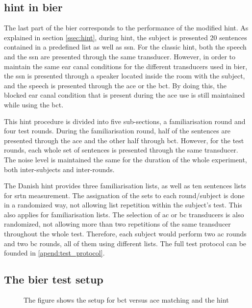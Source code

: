 \subsection{\gls{hint} in \gls{bier}}
The last part of the \gls{bier} corresponds to the performance of the modified \gls{hint}. As explained in section \autoref{ssec:hint}, during \gls{hint}, the subject is presented 20 sentences contained in a predefined list as well as \gls{ssn}. For the classic \gls{hint}, both the speech and the \gls{ssn} are presented through the same transducer. However, in order to maintain the same ear canal conditions for the different transducers used in \gls{bier}, the \gls{ssn} is presented through a speaker located inside the room with the subject, and the speech is presented through the  \gls{ace} or the \gls{bct}. By doing this, the blocked ear canal condition that is present during the \gls{ace} use is still maintained while using the \gls{bct}.

This \gls{hint} procedure is divided into five sub-sections, a familiarisation round and four test rounds. During the familiarisation round, half of the sentences are presented through the \gls{ace} and the other half through \gls{bct}. However, for the test rounds, each whole set of sentences is presented through the same transducer. The noise level is maintained the same for the duration of the whole experiment, both inter-subjects and inter-rounds.

The Danish \gls{hint} provides three familiarisation lists, as well as ten sentences lists for \gls{srtn} measurement. The assignation of the sets to each round/subject is done in a randomized way, not allowing list repetition within the subject's test. This also applies for familiarisation lists. The selection of \gls{ac} or \gls{bc} transducers is also randomized, not allowing more than two repetitions of the same transducer throughout the whole test. Therefore, each subject would perform two \gls{ac} rounds and two \gls{bc} rounds, all of them using different lists. The full test protocol can be founded in \autoref{apend:test_protocol}.


\subsection{The \gls{bier} test setup}


\newpage
\begin{figure}[H]
	\begin{sideways}
	\begin{minipage}{\textheight}
		\centering
\def\svgwidth{\columnwidth}

	\end{minipage}
	\end{sideways}
\caption{The figure shows the setup for \gls{bct} versus \gls{ace} matching and the \gls{hint} }
\label{fig:sec_bier_setup}
\end{figure}



